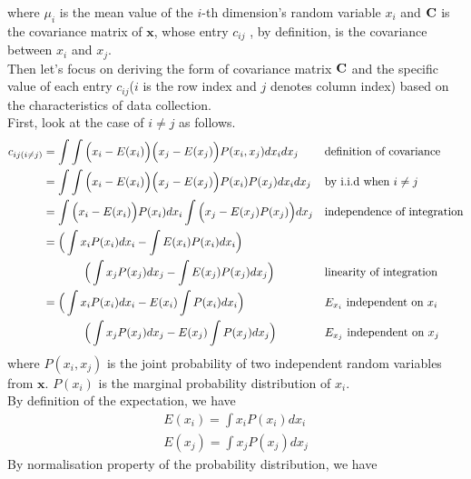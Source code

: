 \documentclass[11pt,a4paper]{article}
\newcommand{\htab}{\hspace*{0.63cm}}
\newcommand{\dhtab}{\hspace*{1.26cm}}
\newcommand{\bs}[1]{\boldsymbol{#1}}
\begin{document}
    \htab where $\mu_{i}$ is the mean value of the $i$-th dimension's random variable $x_{i}$ and $\mathbf{C}$ is the covariance matrix of $\bs{x}$, whose entry $c_{ij}$ , by definition, is the covariance between $x_{i}$ and $x_{j}$. \\
\htab Then let's focus on deriving the form of covariance matrix $\mathbf{C}$  and the specific value of each entry $c_{ij}$($i$ is the row index and $j$ denotes column index) based on the characteristics of data collection. \\
\htab First, look at the case of $i \neq j$ as follows.
    \begin{align}
        c_{ij (i\neq j)}
        &= \int \int \Big(x_{i} - E(x_{i}) \Big)  \Big(x_{j} - E(x_{j}) \Big) 
        P(x_{i},x_{j}) d x_{i} d x_{j} &&\mbox{definition of covariance} \\
        &= \int \int \Big(x_{i} - E(x_{i}) \Big)  \Big(x_{j} - E(x_{j}) \Big) 
        P(x_{i}) P(x_{j}) d x_{i} d x_{j} &&\mbox{by i.i.d when $i \neq j$} \\
        &= \int \Big(x_{i} - E(x_{i}) \Big) P(x_{i}) d x_{i} 
        \int  \Big(x_{j} - E(x_{j}) P(x_{j}) \Big)  d x_{j} &&\mbox{independence of integration}  \\
        &= \Big( \int x_{i}  P(x_{i}) d x_{i} - \int  E(x_{i}) P(x_{i}) d x_{i} \Big)  \nonumber \\
         &\dhtab  \Big(\int x_{j}P(x_{j}) d x_{j} - \int E(x_{j}) P(x_{j})d x_{j}  \Big)  
        &&\mbox{linearity of integration} \\
        &= \Big( \int x_{i}  P(x_{i}) d x_{i} -  E(x_{i}) \int P(x_{i}) d x_{i} \Big) 
        &&\mbox{$E_{x_{i}}$ independent on $x_{i}$} \nonumber \\
         &\dhtab  \Big(\int x_{j}P(x_{j}) d x_{j} -  E(x_{j}) \int P(x_{j})d x_{j}  \Big) 
        &&\mbox{$E_{x_{j}}$ independent on $x_{j}$} \label{1:sigmahalf}
    \end{align}
\htab where $P(x_{i}, x_{j})$ is the joint probability of two independent random variables from $\bs{x}$. 
$P(x_{i})$ is the marginal probability distribution of $x_{i}$. \\
\htab By definition of the expectation, we have
\begin{align}
    E(x_{i}) = \int x_{i} P(x_{i}) d x_{i} \label{1:expect1} \\
    E(x_{j}) = \int x_{j} P(x_{j}) d x_{j} \label{1:expect2}
    \end{align}
\htab By normalisation property of the probability distribution, we have
\end{document}
